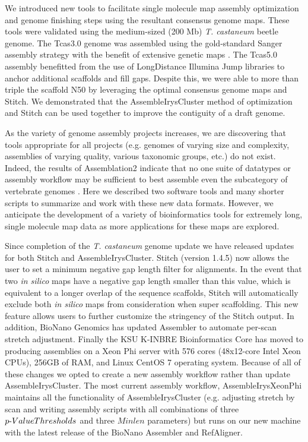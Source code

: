 \documentclass{bmcart}
\begin{document}
We introduced new tools to facilitate single molecule map assembly optimization and genome finishing steps using the resultant consensus genome maps. These tools were validated using the medium-sized (200 Mb) \textit{T. castaneum} beetle genome. The Tcas3.0 genome was  assembled using the gold-standard Sanger assembly strategy \cite{Beetle2008} with the benefit of extensive genetic maps \cite{BeetleGenMap2005}. The Tcas5.0 assembly benefitted from the use of LongDistance Illumina Jump libraries to anchor additional scaffolds and fill gaps. Despite this, we were able to more than triple the scaffold N50 by leveraging the optimal consensus genome maps and Stitch. We demonstrated that the AssembleIrysCluster method of optimization and Stitch can be used together to improve the contiguity of a draft genome.

As the variety of genome assembly projects increases, we are discovering that tools appropriate for all projects (e.g. genomes of varying size and complexity, assemblies of varying quality, various taxonomic groups, etc.) do not exist. Indeed, the results of Assemblation2 indicate that no one suite of datatypes or assembly workflow may be sufficient to best assemble even the subcategory of vertebrate genomes \cite{Assem22013}. Here we described two software tools and many shorter scripts to summarize and work with these new data formats. However, we anticipate the development of a variety of bioinformatics tools for extremely long, single molecule map data as more applications for these maps are explored.

Since completion of the \textit{T. castaneum} genome update we have released updates for both Stitch and AssembleIrysCluster. Stitch (version 1.4.5) now allows the user to set a minimum negative gap length filter for alignments. In the event that two \textit{in silico} maps have a negative gap length smaller than this value, which is equivalent to a longer overlap of the sequence scaffolds, Stitch will automatically exclude both \textit{in silico} maps from consideration when super scaffolding. This new feature allows users to further customize the stringency of the Stitch output. In addition, BioNano Genomics has updated Assembler to automate per-scan stretch adjustment. Finally the KSU K-INBRE Bioinformatics Core has moved to producing assemblies on a Xeon Phi server with 576 cores (48x12-core Intel Xeon CPUs), 256GB of RAM, and Linux CentOS 7 operating system. Because of all of these changes we opted to create a new assembly workflow rather than update AssembleIrysCluster. The most current assembly workflow, AssembleIrysXeonPhi maintains all the functionality of AssembleIrysCluster (e.g. adjusting stretch by scan and writing assembly scripts with all combinations of three $p\textnormal{-}Value Thresholds$ and three $Minlen$ parameters) but runs on our new machine with the latest release of the BioNano Assembler and RefAligner.
\end{document}
